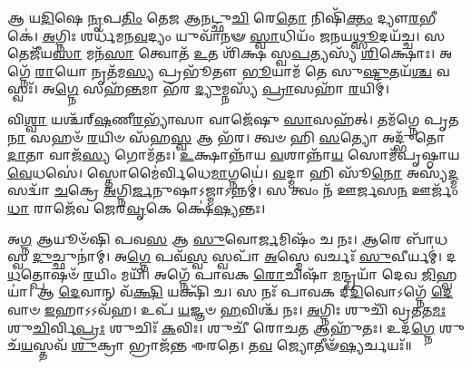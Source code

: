 𑌆 𑌯\-\ul{𑌦𑌿}\-𑌷𑍇 \ul{𑌨𑍃}\-𑌪\-\ul{𑌤𑌿𑌂} 𑌤𑍇\-\ul{𑌜} 𑌆\-\ul{𑌨}\-𑌟𑍍𑌛𑍁\-\ul{𑌚𑌿} 𑌰𑍇\-\ul{𑌤𑍋} 𑌨𑌿𑌷𑌿᳴\-\ul{𑌕𑍍𑌤𑌂} 𑌦𑍍𑌯𑍗\-\ul{𑌰}\-𑌭𑍀𑌕𑍇॑।
\-\ul{𑌅}\-𑌗𑍍𑌨𑌿𑌃 𑌶𑌰𑍍𑌧᳴𑌮𑌨\-\ul{𑌵}\-𑌦𑍍𑌯𑌂 𑌯𑍁𑌵𑌾᳴𑌨𑍟 \ul{𑌸𑍍𑌵𑌾}\-𑌧𑌿𑌯𑌂᳴ 𑌜𑌨𑌯\-\ul{𑌥𑍍𑌸𑍂}\-𑌦𑌯᳴𑌚𑍍𑌚। 𑌸 𑌤𑍇𑌜𑍀᳴𑌯\-\ul{𑌸𑌾} 𑌮𑌨᳴\-\ul{𑌸𑌾} 𑌤𑍍𑌵𑍋𑌤᳴ \ul{𑌉}\-𑌤 𑌶𑌿᳴𑌕𑍍𑌷 𑌸𑍍𑌵\-\ul{𑌪}\-𑌤𑍍𑌯𑌸𑍍𑌯᳴ \ul{𑌶𑌿}\-𑌕𑍍𑌷𑍋𑌃। 𑌅𑌗𑍍𑌨𑍇᳴ \ul{𑌰𑌾}\-𑌯𑍋 𑌨𑍃𑌤᳴𑌮\-\ul{𑌸𑍍𑌯} 𑌪𑍍𑌰𑌭𑍂᳴𑌤𑍗 \ul{𑌭𑍂}\-𑌯𑌾𑌮᳴ 𑌤𑍇 𑌸𑍁\-\ul{𑌷𑍍𑌟𑍁}\-𑌤𑌯᳴\-\ul{𑌶𑍍𑌚} 𑌵𑌸𑍍𑌵𑌃᳴। 𑌅\-\ul{𑌗𑍍𑌨𑍇} 𑌸𑌹᳴\-\ul{𑌨𑍍𑌤}\-𑌮𑌾 𑌭᳴𑌰 \ul{𑌦𑍍𑌯𑍁}\-𑌮𑍍𑌨𑌸𑍍𑌯᳴ \ul{𑌪𑍍𑌰𑌾}\-𑌸𑌹𑌾᳴ \ul{𑌰}\-𑌯𑌿𑌮𑍍।

 𑌵𑌿\-\ul{𑌶𑍍𑌵𑌾} 𑌯𑌶𑍍𑌚᳴𑌰𑍍‌\-\ul{𑌷}\-𑌣𑍀\-\ul{𑌰}\-𑌭𑍍𑌯𑌾᳴𑌸𑌾 𑌵𑌾𑌜𑍇᳴𑌷𑍁 \ul{𑌸𑌾}\-𑌸𑌹᳴𑌤𑍍। 
𑌤𑌮᳴𑌗𑍍𑌨𑍇 𑌪𑍃𑌤\-\ul{𑌨𑌾} 𑌸𑌹𑍞᳴ \ul{𑌰}\-𑌯𑌿𑍞 𑌸᳴𑌹\-\ul{𑌸𑍍𑌵} 𑌆 𑌭᳴𑌰। 𑌤𑍍𑌵𑍞 𑌹𑌿 \ul{𑌸}\-𑌤𑍍𑌯𑍋 𑌅𑌦𑍍𑌭𑍁᳴𑌤𑍋 \ul{𑌦𑌾}\-𑌤𑌾 𑌵𑌾𑌜᳴\-\ul{𑌸𑍍𑌯} 𑌗𑍋𑌮᳴𑌤𑌃। \ul{𑌉}\-𑌕𑍍𑌷𑌾𑌨𑍍𑌨𑌾᳴𑌯 \ul{𑌵}\-𑌶𑌾𑌨𑍍𑌨𑌾᳴\-\ul{𑌯} 𑌸𑍋𑌮᳴𑌪𑍃𑌷𑍍𑌠𑌾𑌯 \ul{𑌵𑍇}\-𑌧𑌸𑍇॑। 𑌸𑍍𑌤𑍋𑌮𑍈॑𑌰𑍍𑌵𑌿𑌧𑍇\-\ul{𑌮𑌾}\-𑌗𑍍𑌨𑌯𑍇॑। \ul{𑌵}\-𑌦𑍍𑌮𑌾 𑌹𑌿 𑌸𑍂᳴\-\ul{𑌨𑍋} 𑌅𑌸𑍍𑌯᳴\-\ul{𑌦𑍍𑌮}\-𑌸𑌦𑍍𑌵𑌾᳴ \ul{𑌚}\-𑌕𑍍𑌰𑍇 \ul{𑌅}\-𑌗𑍍𑌨𑌿\-\ul{𑌰𑍍𑌜}\-𑌨𑍁𑌷𑌾𑌽𑌜𑍍𑌮𑌾𑌽𑌨𑍍𑌨𑌮𑍍॑। 𑌸 𑌤𑍍𑌵𑌂 𑌨᳴ 𑌊𑌰𑍍𑌜𑌸\-\ul{𑌨} 𑌊𑌰𑍍𑌜𑌂᳴ \ul{𑌧𑌾}  𑌰𑌾𑌜𑍇᳴𑌵 𑌜𑍇𑌰\-\ul{𑌵𑍃}\-𑌕𑍇 𑌕𑍍𑌷𑍇॑\-\ul{𑌷𑍍𑌯}\-𑌨𑍍𑌤𑌃।

𑌅\-\ul{𑌗𑍍𑌨} 𑌆𑌯𑍂𑍞᳴𑌷𑌿 𑌪𑌵\-\ul{𑌸} 𑌆 \ul{𑌸𑍁}\-𑌵𑍋\-\ul{𑌰𑍍𑌜}\-𑌮𑌿𑌷𑌂᳴ 𑌚 𑌨𑌃। \ul{𑌆}\-𑌰𑍇 𑌬𑌾᳴𑌧𑌸𑍍𑌵 \ul{𑌦𑍁}\-𑌚𑍍𑌛𑍁𑌨𑌾॑𑌮𑍍। 𑌅\-\ul{𑌗𑍍𑌨𑍇} 𑌪𑌵᳴\-\ul{𑌸𑍍𑌵} 𑌸𑍍𑌵𑌪𑌾᳴ \ul{𑌅}\-𑌸𑍍𑌮𑍇 𑌵𑌰𑍍𑌚𑌃᳴ \ul{𑌸𑍁}\-𑌵𑍀𑌰𑍍𑌯𑌮𑍍॑। 𑌦\-\ul{𑌧}\-𑌤𑍍𑌪𑍋𑌷𑍞᳴ \ul{𑌰}\-𑌯𑌿𑌂 𑌮𑌯𑌿᳴।
𑌅𑌗𑍍𑌨𑍇᳴ 𑌪𑌾𑌵𑌕 \ul{𑌰𑍋}\-𑌚𑌿𑌷𑌾᳴ \ul{𑌮}\-𑌨𑍍𑌦𑍍𑌰𑌯𑌾᳴ 𑌦𑍇𑌵 \ul{𑌜𑌿}\-𑌹𑍍𑌵𑌯𑌾॑। 𑌆 \ul{𑌦𑍇}\-𑌵𑌾𑌨𑍍 𑌵᳴\-\ul{𑌕𑍍𑌷𑌿} 𑌯𑌕𑍍𑌷𑌿᳴ 𑌚। 𑌸 𑌨𑌃᳴ 𑌪𑌾𑌵𑌕 𑌦𑍀\-\ul{𑌦𑌿}\-𑌵𑍋𑌽𑌗𑍍𑌨𑍇᳴ \ul{𑌦𑍇}\-𑌵𑌾𑍞 \ul{𑌇}\-𑌹𑌾𑌽𑌽𑌵᳴𑌹। 𑌉𑌪᳴ \ul{𑌯}\-𑌜𑍍𑌞𑍞 \ul{𑌹}\-𑌵𑌿𑌶𑍍𑌚᳴ 𑌨𑌃। \ul{𑌅}\-𑌗𑍍𑌨𑌿𑌃 𑌶𑍁𑌚𑌿᳴ 𑌵𑍍𑌰𑌤𑌤\-\ul{𑌮𑌃} 𑌶𑍁\-\ul{𑌚𑌿}\-𑌰𑍍𑌵𑌿\-\ul{𑌪𑍍𑌰𑌃} 𑌶𑍁𑌚𑌿𑌃᳴ \ul{𑌕}\-𑌵𑌿𑌃। 𑌶𑍁𑌚𑍀᳴ 𑌰𑍋𑌚\-\ul{𑌤} 𑌆𑌹𑍁᳴𑌤𑌃। 𑌉𑌦᳴\-\ul{𑌗𑍍𑌨𑍇} 𑌶𑍁𑌚᳴\-\ul{𑌯}\-𑌸𑍍𑌤𑌵᳴ \ul{𑌶𑍁}\-𑌕𑍍𑌰𑌾 𑌭𑍍𑌰𑌾𑌜᳴𑌨𑍍𑌤 𑌈𑌰𑌤𑍇। 𑌤\-\ul{𑌵} 𑌜𑍍𑌯𑍋𑌤𑍀𑍟᳴\-\ul{𑌷𑍍𑌯}\-𑌰𑍍𑌚𑌯𑌃᳴॥


